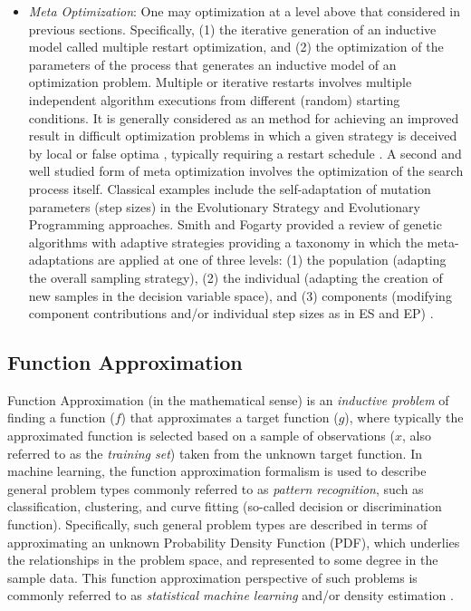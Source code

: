 \documentclass[a4paper, 11pt]{article}
\begin{document}
\begin{itemize}
	\item \emph{Meta Optimization}: One may optimization at a level above that considered in previous sections. Specifically, (1) the iterative generation of an inductive model called multiple restart optimization, and (2) the optimization of the parameters of the process that generates an inductive model of an optimization problem. Multiple or iterative restarts involves multiple independent algorithm executions from different (random) starting conditions. It is generally considered as an method for achieving an improved result in difficult optimization problems in which a given strategy is deceived by local or false optima \cite{Muselli1997, Hu1994}, typically requiring a restart schedule \cite{Fukunaga1998}. A second and well studied form of meta optimization involves the optimization of the search process itself. Classical examples include the self-adaptation of mutation parameters (step sizes) in the Evolutionary Strategy and Evolutionary Programming approaches. Smith and Fogarty provided a review of genetic algorithms with adaptive strategies providing a taxonomy in which the meta-adaptations are applied at one of three levels: (1) the population (adapting the overall sampling strategy), (2) the individual (adapting the creation of new samples in the decision variable space), and (3) components (modifying component contributions and/or individual step sizes as in ES and EP) \cite{Smith1997b}.
	
\end{itemize}



%
%
\subsection{Function Approximation}
Function Approximation (in the mathematical sense) is an \emph{inductive problem} of finding a function ($f$) that approximates a target function ($g$), where typically the approximated function is selected based on a sample of observations ($x$, also referred to as the \emph{training set}) taken from the unknown target function.
In machine learning, the function approximation formalism is used to describe general problem types commonly referred to as \emph{pattern recognition}, such as classification, clustering, and curve fitting (so-called decision or discrimination function). Specifically, such general problem types are described in terms of approximating an unknown Probability Density Function (PDF), which underlies the relationships in the problem space, and represented to some degree in the sample data. This function approximation perspective of such problems is commonly referred to as \emph{statistical machine learning} and/or density estimation \cite{Fukunaga1990, Bishop1995}.
\end{document}
